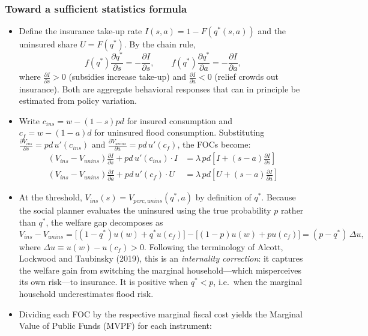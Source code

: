 \documentclass[12pt]{article}
\begin{document}
\subsubsection*{Toward a sufficient statistics formula}

\begin{itemize}
    \item Define the insurance take-up rate $I(s,a) = 1 - F(q^*(s,a))$ and the uninsured share $U = F(q^*)$. By the chain rule,
    \[
    f(q^*)\frac{\partial q^*}{\partial s} = -\frac{\partial I}{\partial s}, \qquad
    f(q^*)\frac{\partial q^*}{\partial a} = -\frac{\partial I}{\partial a},
    \]
    where $\frac{\partial I}{\partial s} > 0$ (subsidies increase take-up) and $\frac{\partial I}{\partial a} < 0$ (relief crowds out insurance). Both are aggregate behavioral responses that can in principle be estimated from policy variation.
    \item Write $c_{ins} = w - (1-s)pd$ for insured consumption and $c_f = w - (1-a)d$ for uninsured flood consumption. Substituting $\frac{\partial V_{ins}}{\partial s} = pd\,u'(c_{ins})$ and $\frac{\partial V_{unins}}{\partial a} = pd\,u'(c_f)$, the FOCs become:
    \begin{align}
        (V_{ins} - V_{unins})\frac{\partial I}{\partial s} + pd\,u'(c_{ins})\cdot I &= \lambda\,pd\!\left[I + (s-a)\frac{\partial I}{\partial s}\right] \label{eq:foc_s_suff} \\[6pt]
        (V_{ins} - V_{unins})\frac{\partial I}{\partial a} + pd\,u'(c_f)\cdot U &= \lambda\,pd\!\left[U + (s-a)\frac{\partial I}{\partial a}\right] \label{eq:foc_a_suff}
    \end{align}
    \item At the threshold, $V_{ins}(s) = V_{perc,unins}(q^*,a)$ by definition of $q^*$. Because the social planner evaluates the uninsured using the true probability $p$ rather than $q^*$, the welfare gap decomposes as
    \[
    V_{ins} - V_{unins} = \bigl[(1-q^*)u(w) + q^*u(c_f)\bigr] - \bigl[(1-p)u(w) + pu(c_f)\bigr] = (p - q^*)\,\Delta u,
    \]
    where $\Delta u \equiv u(w) - u(c_f) > 0$. Following the terminology of Alcott, Lockwood and Taubinsky (2019), this is an \emph{internality correction}: it captures the welfare gain from switching the marginal household---which misperceives its own risk---to insurance. It is positive when $q^* < p$, i.e.\ when the marginal household underestimates flood risk.
    \item Dividing each FOC by the respective marginal fiscal cost yields the Marginal Value of Public Funds (MVPF) for each instrument:

\end{itemize}
\end{document}
